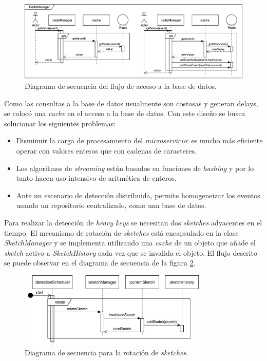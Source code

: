 \documentclass[a4paper,10pt, oneside]{article}
\begin{document}
\begin{figure}[htbp]
	\centering
	\includegraphics[width=1\textwidth]{graph/SecDiag-redisManagerGetValue.pdf}
	\caption{Diagrama de secuencia del flujo de acceso a la base de datos.}
	\label{fig:RedisManagerGetValue}
	
\end{figure}

Como las consultas a la base de datos usualmente son costosas y generan delays, se colocó una \textit{cache} en el acceso a la base de datos. Con este diseño se busca solucionar los siguientes problemas:
\begin{itemize}
	\item Disminuir la carga de procesamiento del \textit{microservicio}: es mucho más eficiente operar con valores enteros que con cadenas de caracteres.
	\item Los algoritmos de \textit{streaming} están basados en funciones de \textit{hashing} y por lo tanto hacen uso intensivo de aritmética de enteros.
	\item Ante un escenario de detección distribuida, permite homogeneizar los eventos usando un repositorio centralizado, como una base de datos.
\end{itemize}


Para realizar la detección de \textit{heavy keys} se necesitan dos \textit{sketches} adyacentes en el tiempo. El mecanismo de rotación de \textit{sketches} está encapsulado en la clase \textit{SketchManager} y se implementa utilizando una \textit{cache} de un objeto que añade el \textit{sketch} activo a \textit{SketchHistory} cada vez que se invalida el objeto. El flujo descrito se puede observar en el diagrama de secuencia de la figura \ref{fig:SecDiagDetectionSchedulerRotation}.

\begin{figure}[htbp]
	\centering
	\includegraphics[width=0.8\textwidth]{graph/SecDiag-detectionSchedulerRotation.pdf}
	\caption{Diagrama de secuencia para la rotación de \textit{sketches}.}
	\label{fig:SecDiagDetectionSchedulerRotation}
\end{figure}
\end{document}
